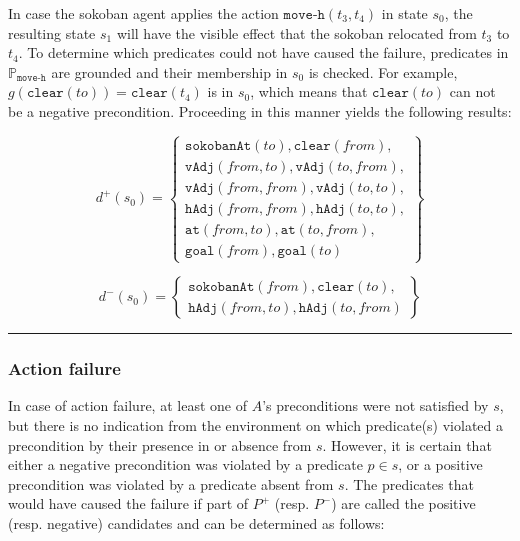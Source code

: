 \documentclass[../../Master.tex]{subfiles}
\begin{document}
\begin{example} \label{ex:moveSucceeded}
    In case the sokoban agent applies the action $\texttt{move-h}(t_3, t_4)$ in state $s_0$, the resulting state $s_1$ will have the visible effect that the sokoban relocated from $t_3$ to $t_4$. To determine which predicates could not have caused the failure, predicates in $\mathbb{P}_{\texttt{move-h}}$ are grounded and their membership in $s_0$ is checked. For example, $g \left( \texttt{clear}(to) \right) = \texttt{clear}\left( t_4 \right)$ is in $s_0$, which means that $\texttt{clear}(to)$ can not be a negative precondition. Proceeding in this manner yields the following results:

    \begin{equation*}
        d^+(s_0) = \left\{
            \begin{gathered}
                \texttt{sokobanAt}(to), \texttt{clear}(from), \\
                \texttt{vAdj}(from, to), \texttt{vAdj}(to, from), \\
                \texttt{vAdj}(from, from), \texttt{vAdj}(to, to), \\
                \texttt{hAdj}(from, from), \texttt{hAdj}(to, to), \\
                \texttt{at}(from, to), \texttt{at}(to, from), \\
                \texttt{goal}(from), \texttt{goal}(to)
            \end{gathered}
        \right\}
    \end{equation*}

    \begin{equation*}
        d^-(s_0) = \left\{
            \begin{gathered}
                \texttt{sokobanAt}(from), \texttt{clear}(to), \\
                \texttt{hAdj}(from, to), \texttt{hAdj}(to, from)
            \end{gathered}
        \right\}
    \end{equation*}

    \noindent\rule{\textwidth}{1pt}
\end{example}

\subsubsection*{Action failure}
In case of action failure, at least one of $A$'s preconditions were not satisfied by $s$, but there is no indication from the environment on which predicate(s) violated a precondition by their presence in or absence from $s$. However, it is certain that either a negative precondition was violated by a predicate $p \in s$, or a positive precondition was violated by a predicate absent from $s$. The predicates that would have caused the failure if part of $P^+$ (resp. $P^-$) are called the positive (resp. negative) candidates and can be determined as follows:
\end{document}
